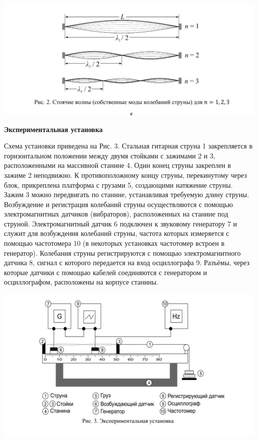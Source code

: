 \documentclass[a4paper,12pt]{article} %
\begin{document}
\includegraphics[width=\textwidth]{1.4.5 3}

{\bf Экспериментальная установка}

Схема установки приведена на Рис. 3. Стальная гитарная струна 1 закрепляется в горизонтальном положении между двумя стойками с зажимами 2 и 3,
расположенными на массивной станине 4. Один конец струны закреплен в
зажиме 2 неподвижно. К противоположному концу струны, перекинутому через блок, прикреплена платформа с грузами 5, создающими натяжение
струны. Зажим 3 можно передвигать по станине, устанавливая требуемую
длину струны. Возбуждение и регистрация колебаний струны осуществляются с помощью электромагнитных датчиков (вибраторов), расположенных
на станине под струной. Электромагнитный датчик 6 подключен к звуковому
генератору 7 и служит для возбуждения колебаний струны, частота которых
измеряется с помощью частотомера 10 (в некоторых установках частотомер
встроен в генератор). Колебания струны регистрируются с помощью электромагнитного датчика 8, сигнал с которого передается на вход осциллографа 9.
Разъёмы, через которые датчики с помощью кабелей соединяются с генератором и осциллографом, расположены на корпусе станины.

\includegraphics[width=\textwidth]{1.4.5 4}
\end{document}
